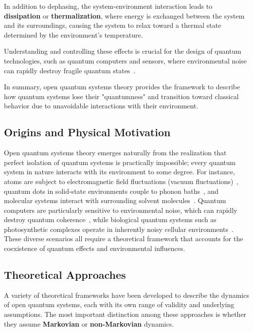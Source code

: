 In addition to dephasing, the system-environment interaction leads to \textbf{dissipation} or \textbf{thermalization}, where energy is exchanged between the system and its surroundings, causing the system to relax toward a thermal state determined by the environment's temperature.

Understanding and controlling these effects is crucial for the design of quantum technologies, such as quantum computers and sensors, where environmental noise can rapidly destroy fragile quantum states~\cite{schlosshauer2007decoherencebook, laddetal2010quantumcomputers}.

In summary, open quantum systems theory provides the framework to describe how quantum systems lose their "quantumness" and transition toward classical behavior due to unavoidable interactions with their environment.

\subsection{Origins and Physical Motivation}

Open quantum systems theory emerges naturally from the realization that perfect isolation of quantum systems is practically impossible; every quantum system in nature interacts with its environment to some degree. For instance, atoms are subject to electromagnetic field fluctuations (vacuum fluctuations)~\cite{breuerpetruccione2009theoryopenquantum}, quantum dots in solid-state environments couple to phonon baths~\cite{weiss2012quantumdissipativesystems}, and molecular systems interact with surrounding solvent molecules~\cite{mukamel1995principlesnonlinearoptical}. Quantum computers are particularly sensitive to environmental noise, which can rapidly destroy quantum coherence~\cite{laddetal2010quantumcomputers}, while biological quantum systems such as photosynthetic complexes operate in inherently noisy cellular environments~\cite{schlosshauer2007decoherencebook}. These diverse scenarios all require a theoretical framework that accounts for the coexistence of quantum effects and environmental influences.


\subsection{Theoretical Approaches}

A variety of theoretical frameworks have been developed to describe the dynamics of open quantum systems, each with its own range of validity and underlying assumptions. The most important distinction among these approaches is whether they assume \textbf{Markovian} or \textbf{non-Markovian} dynamics.

